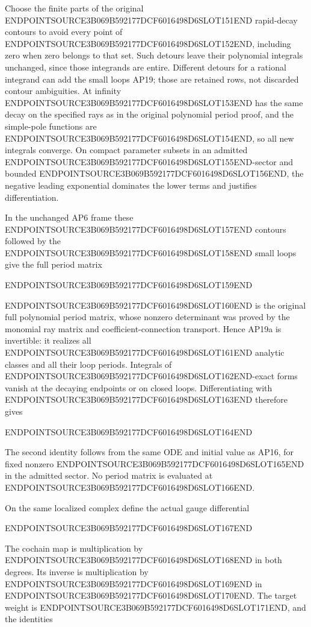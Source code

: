 Choose the finite parts of the original ENDPOINTSOURCE3B069B592177DCF6016498D6SLOT151END rapid-decay contours to avoid every point of ENDPOINTSOURCE3B069B592177DCF6016498D6SLOT152END, including zero when zero belongs to that set. Such detours leave their polynomial integrals unchanged, since those integrands are entire. Different detours for a rational integrand can add the small loops AP19; those are retained rows, not discarded contour ambiguities. At infinity ENDPOINTSOURCE3B069B592177DCF6016498D6SLOT153END has the same decay on the specified rays as in the original polynomial period proof, and the simple-pole functions are ENDPOINTSOURCE3B069B592177DCF6016498D6SLOT154END, so all new integrals converge. On compact parameter subsets in an admitted ENDPOINTSOURCE3B069B592177DCF6016498D6SLOT155END-sector and bounded ENDPOINTSOURCE3B069B592177DCF6016498D6SLOT156END, the negative leading exponential dominates the lower terms and justifies differentiation.

In the unchanged AP6 frame these ENDPOINTSOURCE3B069B592177DCF6016498D6SLOT157END contours followed by the ENDPOINTSOURCE3B069B592177DCF6016498D6SLOT158END small loops give the full period matrix

ENDPOINTSOURCE3B069B592177DCF6016498D6SLOT159END

ENDPOINTSOURCE3B069B592177DCF6016498D6SLOT160END is the original full polynomial period matrix, whose nonzero determinant was proved by the monomial ray matrix and coefficient-connection transport. Hence AP19a is invertible: it realizes all ENDPOINTSOURCE3B069B592177DCF6016498D6SLOT161END analytic classes and all their loop periods. Integrals of ENDPOINTSOURCE3B069B592177DCF6016498D6SLOT162END-exact forms vanish at the decaying endpoints or on closed loops. Differentiating with ENDPOINTSOURCE3B069B592177DCF6016498D6SLOT163END therefore gives

ENDPOINTSOURCE3B069B592177DCF6016498D6SLOT164END

The second identity follows from the same ODE and initial value as AP16, for fixed nonzero ENDPOINTSOURCE3B069B592177DCF6016498D6SLOT165END in the admitted sector. No period matrix is evaluated at ENDPOINTSOURCE3B069B592177DCF6016498D6SLOT166END.

On the same localized complex define the actual gauge differential

ENDPOINTSOURCE3B069B592177DCF6016498D6SLOT167END

The cochain map is multiplication by ENDPOINTSOURCE3B069B592177DCF6016498D6SLOT168END in both degrees. Its inverse is multiplication by ENDPOINTSOURCE3B069B592177DCF6016498D6SLOT169END in ENDPOINTSOURCE3B069B592177DCF6016498D6SLOT170END. The target weight is ENDPOINTSOURCE3B069B592177DCF6016498D6SLOT171END, and the identities

